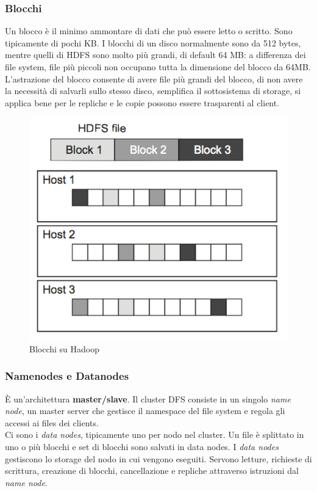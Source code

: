 \documentclass{article}
\begin{document}
\begin{appendices}
\subsubsection{Blocchi}
Un blocco è il minimo ammontare di dati che può essere letto o scritto. Sono tipicamente di pochi KB. I blocchi di un disco normalmente sono da 512 bytes, mentre quelli di HDFS sono molto più grandi, di default 64 MB: a differenza dei file system, file più piccoli non occupano tutta la dimensione del blocco da 64MB. \\
L'astrazione del blocco consente di avere file più grandi del blocco, di non avere la necessità di salvarli sullo stesso disco, semplifica il sottosistema di storage, si applica bene per le repliche e le copie possono essere trasparenti al client.
\begin{figure}[H]
    \centering
    \includegraphics[scale=0.4]{img/Blocchi.png}
    \caption{Blocchi su Hadoop}
\end{figure}\noindent

\subsubsection{Namenodes e Datanodes}
È un'architettura \textbf{master/slave}. Il cluster DFS consiste in un singolo \textit{name node}, un master server che gestisce il namespace del file system e regola gli accessi ai files dei clients. \\
Ci sono i \textit{data nodes}, tipicamente uno per nodo nel cluster. Un file è splittato in uno o più blocchi e set di blocchi sono salvati in data nodes. I \textit{data nodes} gestiscono lo storage del nodo in cui vengono eseguiti. Servono letture, richieste di scrittura, creazione di blocchi, cancellazione e repliche attraverso istruzioni dal \textit{name node}.


\end{appendices}
\end{document}
